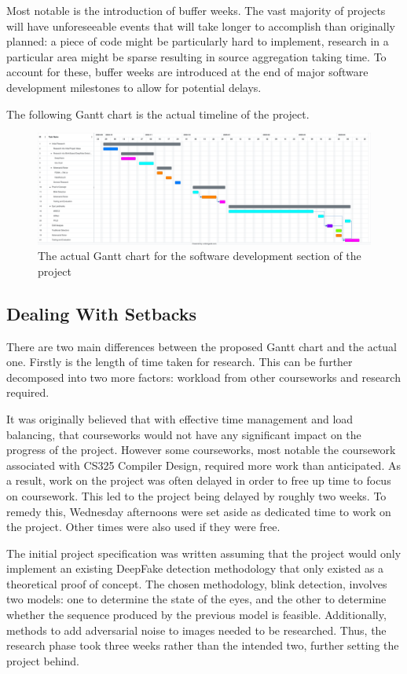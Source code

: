 Most notable is the introduction of buffer weeks. The vast majority of projects will have unforeseeable events that will take longer to accomplish than originally planned: a piece of code might be particularly hard to implement, research in a particular area might be sparse resulting in source aggregation taking time. To account for these, buffer weeks are introduced at the end of major software development milestones to allow for potential delays.

The following Gantt chart is the actual timeline of the project.

\begin{figure}[h]
    \centering
    \includegraphics[width=1\linewidth]{dissertation/figures/actual-gantt.png}
    \caption{The actual Gantt chart for the software development section of the project}
    \label{fig:actual-gantt}
\end{figure}


\subsection{Dealing With Setbacks}

There are two main differences between the proposed Gantt chart and the actual one. Firstly is the length of time taken for research. This can be further decomposed into two more factors: workload from other courseworks and research required. 

It was originally believed that with effective time management and load balancing, that courseworks would not have any significant impact on the progress of the project. However some courseworks, most notable the coursework associated with CS325 Compiler Design, required more work than anticipated. As a result, work on the project was often delayed in order to free up time to focus on coursework. This led to the project being delayed by roughly two weeks. To remedy this, Wednesday afternoons were set aside as dedicated time to work on the project. Other times were also used if they were free. 

The initial project specification was written assuming that the project would only implement an existing DeepFake detection methodology that only existed as a theoretical proof of concept. The chosen methodology, blink detection, involves two models: one to determine the state of the eyes, and the other to determine whether the sequence produced by the previous model is feasible. Additionally, methods to add adversarial noise to images needed to be researched. Thus, the research phase took three weeks rather than the intended two, further setting the project behind.

